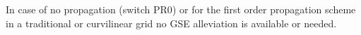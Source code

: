 
\vspace{\baselineskip} 


\noindent
In case of no propagation (switch {\code PR0}) or for the first order
propagation scheme in a traditional or curvilinear grid no GSE alleviation is
available or needed.